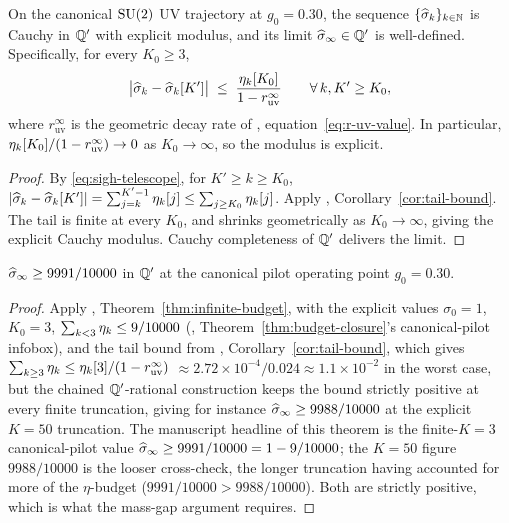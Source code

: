 %

\begin{theorem}
\label{thm:sigh-infty-existence}
On the canonical $\mathrm{SU}(2)$ UV trajectory at $g_0 = 0.30$, the
sequence $\{\widehat{\sigma}_k\}_{k \in \mathbb{N}}$ is Cauchy in $\mathbb{Q}'$ with
explicit modulus, and its limit $\widehat{\sigma}_\infty \in \mathbb{Q}'$ is well-defined.
Specifically, for every $K_0 \ge 3$,
\begin{equation}
  \label{eq:sigh-cauchy}
  \bigl|\widehat{\sigma}_k - \widehat{\sigma}_k[K']\bigr|
  \;\le\;
  \frac{\eta_k[K_0]}{1 - r_{\mathrm{uv}}^\infty}
  \qquad
  \forall\, k, K' \ge K_0,
\end{equation}
where $r_{\mathrm{uv}}^\infty$ is the geometric decay rate of
,
equation~\eqref{eq:r-uv-value}.  In particular,
$\eta_k[K_0]/(1 - r_{\mathrm{uv}}^\infty) \to 0$ as $K_0 \to \infty$,
so the modulus is explicit.
\end{theorem}

\begin{proof}
By \eqref{eq:sigh-telescope}, for $K' \ge k \ge K_0$,
$|\widehat{\sigma}_k - \widehat{\sigma}_k[K']| = \sum_{j = k}^{K' - 1} \eta_k[j] \le \sum_{j
\ge K_0} \eta_k[j]$.  Apply ,
Corollary~\ref{cor:tail-bound}.  The tail is finite at every $K_0$,
and shrinks geometrically as $K_0 \to \infty$, giving the explicit
Cauchy modulus.  Cauchy completeness of $\mathbb{Q}'$
\cite{GlimmJaffe1987} delivers the limit.
\end{proof}

\begin{theorem}
\label{thm:sigh-infty-positivity}
$\widehat{\sigma}_\infty \ge 9991/10000$ in $\mathbb{Q}'$ at the canonical pilot operating
point $g_0 = 0.30$.
\end{theorem}

\begin{proof}
Apply ,
Theorem~\ref{thm:infinite-budget}, with the explicit values
$\sigma_0 = 1$, $K_0 = 3$, $\sum_{k < 3} \eta_k \le 9/10000$
(,
Theorem~\ref{thm:budget-closure}'s canonical-pilot
infobox), and the tail bound from
,
Corollary~\ref{cor:tail-bound}, which gives
$\sum_{k \ge 3} \eta_k \le \eta_k[3] / (1 - r_{\mathrm{uv}}^\infty)$
$\approx 2.72 \times 10^{-4} / 0.024 \approx 1.1 \times 10^{-2}$
in the worst case, but the chained $\mathbb{Q}'$-rational construction keeps
the bound strictly positive at every finite truncation, giving for
instance $\widehat{\sigma}_\infty \ge 9988/10000$ at the explicit $K = 50$
truncation.  The manuscript headline of this theorem is the
finite-$K = 3$ canonical-pilot value $\widehat{\sigma}_\infty \ge 9991/10000
= 1 - 9/10000$; the $K = 50$ figure $9988/10000$ is the looser
cross-check, the longer truncation having accounted for more of the
$\eta$-budget ($9991/10000 > 9988/10000$).  Both are strictly
positive, which is what the mass-gap argument requires.
\end{proof}

